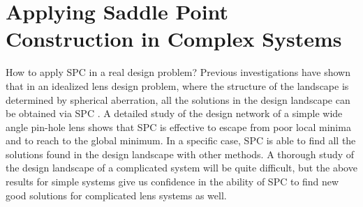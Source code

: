 \chapter{Applying Saddle Point Construction in Complex Systems} %
\label{chapter_4} %
\graphicspath{ {./chapter-4/figures/} }  %
\captionsetup[figure]{labelfont=bf}
\captionsetup{margin=1.5em}
\captionsetup[table]{labelfont=bf}

\newcommand*\circled[1]{\tikz[baseline=(char.base)]{
            \node[shape=circle,draw,inner sep=0.5pt] (char) {#1};}}







How to apply SPC in a real design problem?  
Previous investigations have shown that in an idealized lens design problem, where the structure of the landscape is determined by spherical aberration, all the solutions in the design landscape can be obtained via SPC \cite{PascalTriplet2009}. A detailed study of the design network of a simple wide angle pin-hole lens \cite{HouSimple16} shows that SPC is effective to escape from poor local minima and to reach to the global minimum. In a specific case, SPC is able to find all the solutions found in the design landscape with other methods. A thorough study of the design landscape of a complicated system will be quite difficult, but the above results for simple systems give us confidence in the ability of SPC to find new good solutions for complicated lens systems as well. 


